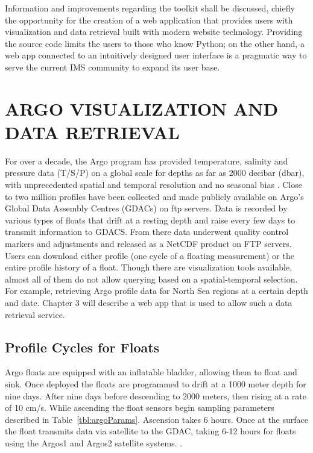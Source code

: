 Information and improvements regarding the toolkit shall be discussed, chiefly the opportunity for the creation of a web application that provides users with visualization and data retrieval built with modern website technology. Providing the source code limits the users to those who know Python; on the other hand, a web app connected to an intuitively designed user interface is a pragmatic way to serve the current IMS community to expand its user base.

\section{ARGO VISUALIZATION AND DATA RETRIEVAL}

For over a decade, the Argo program has provided temperature, salinity and pressure data (T/S/P) on a global scale for depths as far as 2000 decibar (dbar), with unprecedented spatial and temporal resolution and no seasonal bias \cite{argo}. Close to two million profiles have been collected and made publicly available on Argo’s Global Data Assembly Centres (GDACs) on \gls{ftp} servers. Data is recorded by various types of floats that drift at a resting depth and raise every few days to transmit information to GDACS. From there data underwent quality control markers and adjustments and released as a \gls{NetCDF} product on FTP servers. Users can download either profile (one cycle of a floating measurement) or the entire profile history of a float. Though there are visualization tools available, almost all of them do not allow querying based on a spatial-temporal selection. For example, retrieving Argo profile data for North Sea regions at a certain depth and date. Chapter 3 will describe a web app that is used to allow such a data retrieval service.

\subsection{Profile Cycles for Floats}

Argo floats are equipped with an inflatable bladder, allowing them to float and sink. Once deployed the floats are programmed to drift at a 1000 meter depth for nine days. After nine days before descending to 2000 meters, then rising at a rate of 10 cm/s. While ascending the float sensors begin sampling parameters described in Table~\ref{tbl:argoParams}. Ascension takes 6 hours. Once at the surface the float transmits data via satellite to the GDAC, taking 6-12 hours for floats using the Argos1 and Argos2 satellite systems. \cite{argo_uk}.

